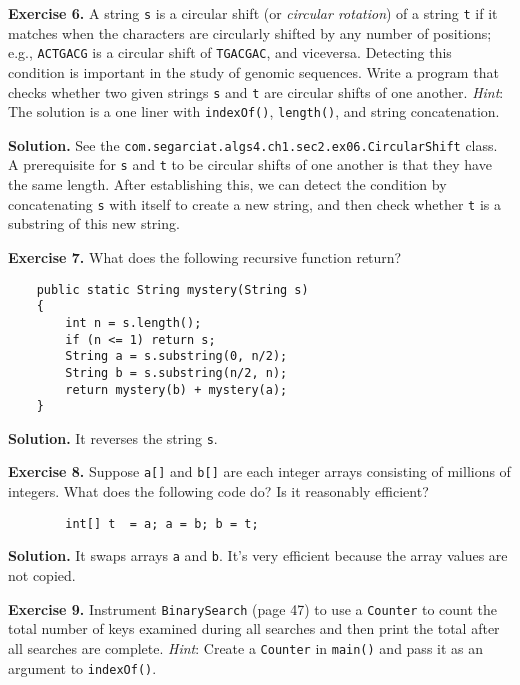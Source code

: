 \documentclass[12pt, a4paper]{article}
\newenvironment{ex}[2][Exercise]
{\par\medskip\noindent \textbf{#1 #2.}}
{\medskip}
\newenvironment{sol}[1][Solution]
{\par\medskip\noindent \textbf{#1.} }
{\medskip}
\begin{document}
	\begin{ex}{6}
		A string \texttt{s} is a circular shift (or \emph{circular rotation}) of a string
		\texttt{t} if it matches when the characters are circularly shifted by any number
		of positions; e.g., \texttt{ACTGACG} is a circular shift of \texttt{TGACGAC}, and
		viceversa. Detecting this condition is important in the study of genomic sequences.
		Write a program that checks whether two given strings \texttt{s} and \texttt{t}
		are circular shifts of one another. \emph{Hint}: The solution is a one liner with
		\texttt{indexOf()}, \texttt{length()}, and string concatenation.
	\end{ex}
	\begin{sol}
		See the \texttt{com.segarciat.algs4.ch1.sec2.ex06.CircularShift} class.
		A prerequisite for \texttt{s} and \texttt{t} to be circular shifts of one another
		is that they have the same length. After establishing this, we can detect the
		condition by concatenating \texttt{s} with itself to create a new string,
		and then check whether \texttt{t} is a substring of this new string.
	\end{sol}
	\begin{ex}{7}
		What does the following recursive function return?
		\begin{lstlisting}
	public static String mystery(String s)
	{
		int n = s.length();
		if (n <= 1) return s;
		String a = s.substring(0, n/2);
		String b = s.substring(n/2, n);
		return mystery(b) + mystery(a);
	}
		\end{lstlisting}
	\end{ex}
	\begin{sol}
		It reverses the string \texttt{s}.
	\end{sol}
	\begin{ex}{8}
		Suppose \texttt{a[]} and \texttt{b[]} are each integer arrays consisting of millions
		of integers. What does the following code do? Is it reasonably efficient?
		\begin{lstlisting}
		int[] t  = a; a = b; b = t;
		\end{lstlisting}
	\end{ex}
	\begin{sol}
		It swaps arrays \texttt{a} and \texttt{b}. It's very efficient because the array
		values are not copied.
	\end{sol}
	\begin{ex}{9}
		Instrument \texttt{BinarySearch} (page 47) to use a \texttt{Counter} to count the total
		number of keys examined during all searches and then print the total after all searches
		are complete. \emph{Hint}: Create a \texttt{Counter} in \texttt{main()} and pass it as
		an argument to \texttt{indexOf()}.
	\end{ex}
\end{document}
